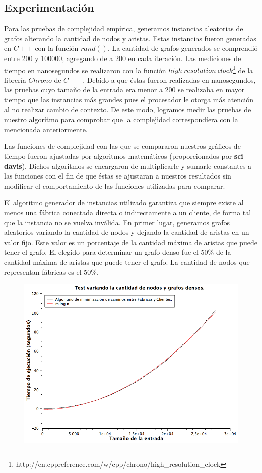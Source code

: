 \subsection{Experimentación}
Para las pruebas de complejidad empírica, generamos instancias aleatorias de grafos alterando la cantidad de nodos y aristas. Estas instancias fueron generadas en $C++$ con la función $rand()$. La cantidad de grafos generados se comprendió entre 200 y 100000, agregando de a 200 en cada iteración. Las mediciones de tiempo en nanosegundos se realizaron con la función $high\ resolution\ clock$\footnote{http://en.cppreference.com/w/cpp/chrono/high\_resolution\_clock} de la librería $Chrono$ de $C++$. Debido a que éstas fueron realizadas en nanosegundos, las pruebas cuyo tamaño de la entrada era menor a 200 se realizaba en mayor tiempo que las instancias más grandes pues el procesador le otorga más atención al no realizar cambio de contexto. De este modo, logramos medir las pruebas de nuestro algoritmo para comprobar que la complejidad correspondiera con la mencionada anteriormente.

Las funciones de complejidad con las que se compararon nuestros gráficos de tiempo fueron ajustadas por algoritmos matemáticos (proporcionados por \textbf{sci davis}). Dichos algoritmos se encargaron de multiplicarle y sumarle constantes a las funciones con el fin de que éstas se ajustaran a nuestros resultados sin modificar el comportamiento de las funciones utilizadas para comparar.

El algoritmo generador de instancias utilizado garantiza que siempre existe al menos una fábrica conectada directa o indirectamente a un cliente, de forma tal que la instancia no se vuelva inválida.
\newpage
En primer lugar, generamos grafos aleatorios variando la cantidad de nodos y dejando la cantidad de aristas en un valor fijo. Este valor es un porcentaje de la cantidad máxima de aristas que puede tener el grafo. El elegido para determinar un grafo denso fue el $50\%$ de la cantidad máxima de aristas que puede tener el grafo. La cantidad de nodos que representan fábricas es el $50\%$.

\begin{figure}[H]
\begin{center}
	\includegraphics[width=350pt]{../tests/ej3/EJ3-nodo-var-denso.png}
\end{center}
\end{figure}

